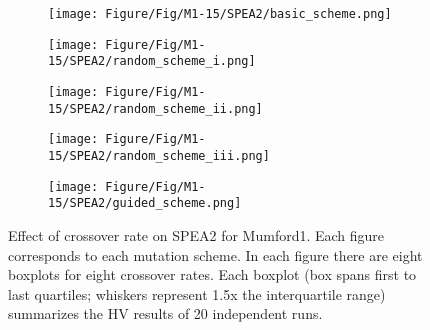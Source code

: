 \begin{figure}[!htbp]
	\centering
	\begin{subfigure}[b]{0.52\textwidth}
		\texttt{[image: Figure/Fig/M1-15/SPEA2/basic\_scheme.png]}
	\end{subfigure}%
	\begin{subfigure}[b]{0.52\textwidth}
		\texttt{[image: Figure/Fig/M1-15/SPEA2/random\_scheme\_i.png]}
	\end{subfigure}%
	\newline
	\begin{subfigure}[b]{0.52\textwidth}
		\texttt{[image: Figure/Fig/M1-15/SPEA2/random\_scheme\_ii.png]}
	\end{subfigure}%
	\begin{subfigure}[b]{0.52\textwidth}
		\texttt{[image: Figure/Fig/M1-15/SPEA2/random\_scheme\_iii.png]}
	\end{subfigure}%
	\newline
	\begin{subfigure}[b]{0.52\textwidth}
		\texttt{[image: Figure/Fig/M1-15/SPEA2/guided\_scheme.png]}
	\end{subfigure}%
	\caption{Effect of crossover rate on SPEA2 for Mumford1. Each figure corresponds to each mutation scheme. In each figure there are eight boxplots for eight crossover rates.  Each boxplot (box spans first to last quartiles; whiskers represent 1.5x the interquartile range) summarizes the HV results of 20 independent runs.}
	\label{fig:cr_m1_spea2}
\end{figure}
